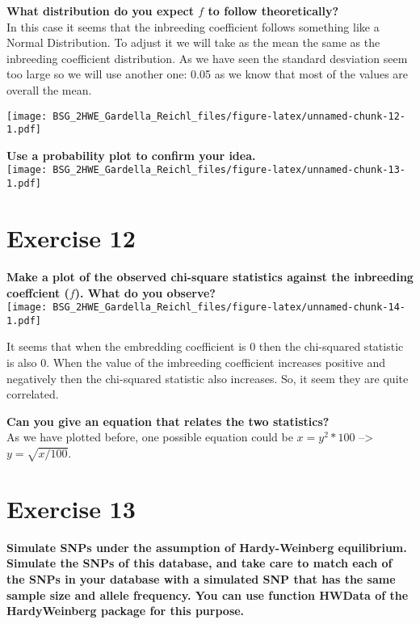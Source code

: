 \documentclass[]{article}
\begin{document}
\textbf{What distribution do you expect \(f\) to follow
theoretically?}\\
In this case it seems that the inbreeding coefficient follows something
like a Normal Distribution. To adjust it we will take as the mean the
same as the inbreeding coefficient distribution. As we have seen the
standard desviation seem too large so we will use another one: 0.05 as
we know that most of the values are overall the mean.

\texttt{[image: BSG\_2HWE\_Gardella\_Reichl\_files/figure-latex/unnamed-chunk-12-1.pdf]}

\textbf{Use a probability plot to confirm your idea.}\\
\texttt{[image: BSG\_2HWE\_Gardella\_Reichl\_files/figure-latex/unnamed-chunk-13-1.pdf]}

\section{Exercise 12}\label{exercise-12}

\textbf{Make a plot of the observed chi-square statistics against the
inbreeding coeffcient (\(f\)). What do you observe?}\\
\texttt{[image: BSG\_2HWE\_Gardella\_Reichl\_files/figure-latex/unnamed-chunk-14-1.pdf]}

It seems that when the embredding coefficient is 0 then the chi-squared
statistic is also 0. When the value of the imbreeding coefficient
increases positive and negatively then the chi-squared statistic also
increases. So, it seem they are quite correlated.

\textbf{Can you give an equation that relates the two statistics?}\\
As we have plotted before, one possible equation could be \(x=y^2*100\)
--\textgreater{} \(y=\sqrt{x/100}\).

\section{Exercise 13}\label{exercise-13}

\textbf{Simulate SNPs under the assumption of Hardy-Weinberg
equilibrium. Simulate the SNPs of this database, and take care to match
each of the SNPs in your database with a simulated SNP that has the same
sample size and allele frequency. You can use function HWData of the
HardyWeinberg package for this purpose.}
\end{document}
